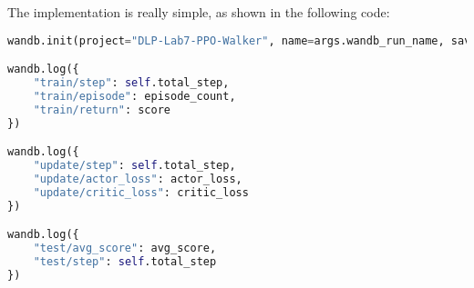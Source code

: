 The implementation is really simple, as shown in the following code:
\begin{lstlisting}[language=Python]
wandb.init(project="DLP-Lab7-PPO-Walker", name=args.wandb_run_name, save_code=True, config=vars(args))

wandb.log({
    "train/step": self.total_step,
    "train/episode": episode_count,
    "train/return": score
})

wandb.log({
    "update/step": self.total_step,
    "update/actor_loss": actor_loss,
    "update/critic_loss": critic_loss
})

wandb.log({
    "test/avg_score": avg_score,
    "test/step": self.total_step
})
\end{lstlisting}


